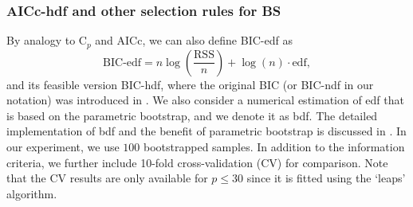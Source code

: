 \subsubsection{AICc-hdf and other selection rules for BS}
\label{sec:bs_ic_simulationresults}
By analogy to C$_p$ and AICc, we can also define BIC-edf as
\begin{equation}
\text{BIC-edf} = n \log\left(\frac{\text{RSS}}{n}\right) + \log(n) \cdot \text{edf},
\label{eq:bic_edf}
\end{equation}
and its feasible version BIC-hdf, where the original BIC (or BIC-ndf in our notation) was introduced in \citet{schwarz1978estimating}. We also consider a numerical estimation of edf that is based on the parametric bootstrap, and we denote it as bdf. The detailed implementation of bdf and the benefit of parametric bootstrap is discussed in \citet{Efron2004}. In our experiment, we use $100$ bootstrapped samples. In addition to the information criteria, we further include 10-fold cross-validation (CV) for comparison. Note that the CV results are only available for $p \le 30$ since it is fitted using the `leaps' algorithm.

